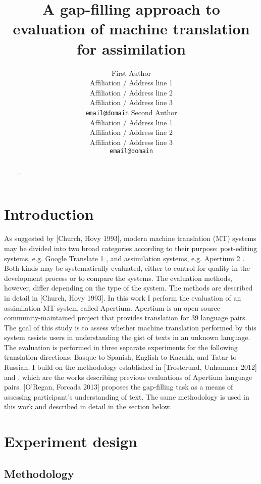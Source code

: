 \documentclass[11pt]{article}
\title{A gap-filling approach to evaluation of machine translation for assimilation}
\author{First Author\\
  Affiliation / Address line 1\\
  Affiliation / Address line 2\\
  Affiliation / Address line 3\\
  {\tt email@domain}  \And
  Second Author\\
  Affiliation / Address line 1\\
  Affiliation / Address line 2\\
  Affiliation / Address line 3\\
  {\tt email@domain}}
\date{}
\begin{document}
\maketitle
\begin{abstract}
   ... 
\end{abstract}

\section{Introduction}

As suggested by [Church, Hovy 1993], modern machine translation (MT) systems may
be divided into two broad categories according to their purpose: post-editing systems, e.g.
Google Translate 1 , and assimilation systems, e.g. Apertium 2 . Both kinds may be
systematically evaluated, either to control for quality in the development process or to
compare the systems. The evaluation methods, however, differ depending on the type of
the system. The methods are described in detail in [Church, Hovy 1993].
In this work I perform the evaluation of an assimilation MT system called Apertium.
Apertium is an open-source community-maintained project that provides translation for
39 language pairs. The goal of this study is to assess whether machine translation
performed by this system assists users in understanding the gist of texts in an unknown
language. The evaluation is performed in three separate experiments for the following
translation directions: Basque to Spanish, English to Kazakh, and Tatar to Russian.
I build on the methodology established in [Trosterund, Unhammer 2012] and
\cite{oregan2013}, which are the works describing previous evaluations of
Apertium language pairs. [O’Regan, Forcada 2013] proposes the gap-filling task as a
means of assessing participant’s understanding of text. The same methodology is used in
this work and described in detail in the section below.

\section{Experiment design}

\subsection{Methodology}
\end{document}
